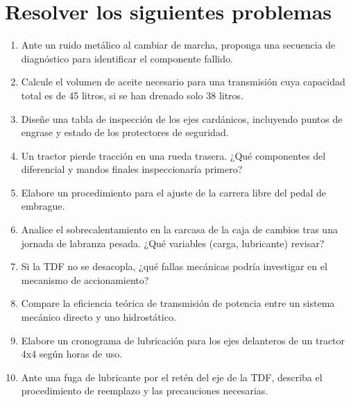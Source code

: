 \section*{\faWrench\space Resolver los siguientes problemas}
\begin{enumerate}
	\item Ante un ruido metálico al cambiar de marcha, proponga una secuencia de
	      diagnóstico para identificar el componente fallido.
	\item Calcule el volumen de aceite necesario para una transmisión cuya capacidad
	      total es de 45 litros, si se han drenado solo 38 litros.
	\item Diseñe una tabla de inspección de los ejes cardánicos, incluyendo puntos de
	      engrase y estado de los protectores de seguridad.
	\item Un tractor pierde tracción en una rueda trasera. ¿Qué componentes del
	      diferencial y mandos finales inspeccionaría primero?
	\item Elabore un procedimiento para el ajuste de la carrera libre del pedal de
	      embrague.
	\item Analice el sobrecalentamiento en la carcasa de la caja de cambios tras una
	      jornada de labranza pesada. ¿Qué variables (carga, lubricante) revisar?
	\item Si la TDF no se desacopla, ¿qué fallas mecánicas podría investigar en el
	      mecanismo de accionamiento?
	\item Compare la eficiencia teórica de transmisión de potencia entre un sistema
	      mecánico directo y uno hidrostático.
	\item Elabore un cronograma de lubricación para los ejes delanteros de un tractor
	      4x4 según horas de uso.
	\item Ante una fuga de lubricante por el retén del eje de la TDF, describa el
	      procedimiento de reemplazo y las precauciones necesarias.
\end{enumerate}
